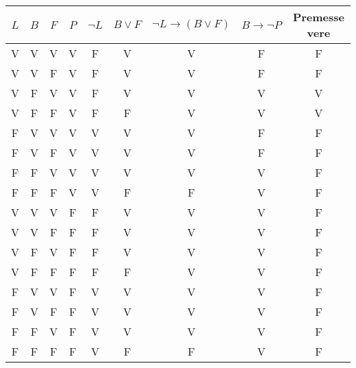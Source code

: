 \documentclass{article}
\begin{document}
\pagecolor{black}
\color{white}

\begin{center}
\renewcommand{\arraystretch}{1.5}
\begin{tabular}{|c|c|c|c|c|c|c|c|c|}
\hline
$L$ & $B$ & $F$ & $P$ & $\neg L$ & $B \lor F$ & $\neg L \rightarrow (B \lor F)$ & $B \rightarrow \neg P$ & Premesse vere \\
\hline
V & V & V & V & F & V & V & F & F \\
\hline
V & V & F & V & F & V & V & F & F \\
\hline
V & F & V & V & F & V & V & V & V \\
\hline
V & F & F & V & F & F & V & V & V \\
\hline
F & V & V & V & V & V & V & F & F \\
\hline
F & V & F & V & V & V & V & F & F \\
\hline
F & F & V & V & V & V & V & V & F \\
\hline
F & F & F & V & V & F & F & V & F \\
\hline
V & V & V & F & F & V & V & V & F \\
\hline
V & V & F & F & F & V & V & V & F \\
\hline
V & F & V & F & F & V & V & V & F \\
\hline
V & F & F & F & F & F & V & V & F \\
\hline
F & V & V & F & V & V & V & V & F \\
\hline
F & V & F & F & V & V & V & V & F \\
\hline
F & F & V & F & V & V & V & V & F \\
\hline
F & F & F & F & V & F & F & V & F \\
\hline
\end{tabular}
\end{center}
\end{document}
